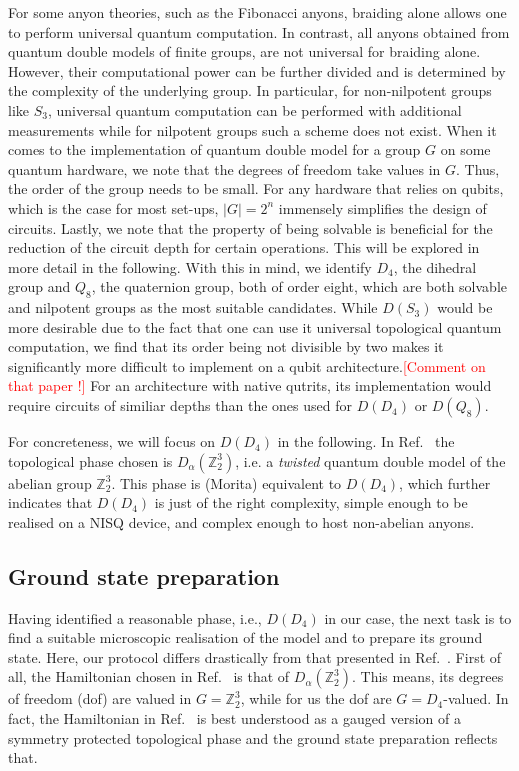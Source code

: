 \documentclass[two column]{article}
\newcommand{\caro}[1]{\textcolor{red}{[#1]}}
\begin{document}
For some anyon theories, such as the Fibonacci anyons, braiding alone allows one to perform universal quantum computation\cite{Freedman2002}. In contrast, all anyons obtained from quantum double models of finite groups, are not universal for braiding alone. However, their computational power can be further divided and is determined by the complexity of the underlying group. In particular, for non-nilpotent groups like $S_3$, universal quantum computation can be performed with additional measurements\cite{Mochon2004} while for nilpotent groups such a scheme does not exist. 
When it comes to the implementation of quantum double model for a group $G$ on some quantum hardware, we note that the degrees of freedom take values in $G$. Thus, the order of the group needs to be small. For any hardware that relies on qubits, which is the case for most set-ups, $|G|=2^n$ immensely simplifies the design of circuits. Lastly, we note that the property of being solvable is beneficial for the reduction of the circuit depth for certain operations. This will be explored in more detail in the following. 
With this in mind, we identify $D_4$, the dihedral group and $Q_8$, the quaternion group, both of order eight, which are both solvable and nilpotent groups as the most suitable candidates.
While $D(S_3)$ would be more desirable due to the fact that one can use it universal topological quantum computation, we find that its order being not divisible by two makes it significantly more difficult to implement on a qubit architecture.\caro{Comment on that paper \cite{goel2023unveiling}!} For an architecture with native qutrits, its implementation would require circuits of similiar depths than the ones used for $D(D_4)$ or $D(Q_8)$.

For concreteness, we will focus on $D(D_4)$ in the following. In Ref.~\cite{iqbal2023creation} the topological phase chosen is $D_\alpha(\mathbb Z_2^3)$, i.e. a \emph{twisted} quantum double model of the abelian group $\mathbb Z_2^3$. This phase is (Morita) equivalent to $D(D_4)$\cite{mapping, propitius1995topological}, which further indicates that $D(D_4)$ is just of the right complexity, simple enough to be realised on a NISQ device, and complex enough to host non-abelian anyons.
\subsection{Ground state preparation}
Having identified a reasonable phase, i.e., $D(D_4)$ in our case, the next task is to find a suitable microscopic realisation of the model and to prepare its ground state. Here, our protocol differs drastically from that presented in Ref.~\cite{iqbal2023creation}. First of all, the Hamiltonian chosen in Ref.~\cite{iqbal2023creation} is that of $D_\alpha(\mathbb Z_2^3)$. This means, its degrees of freedom (dof) are valued in $G=\mathbb Z_2^3$, while for us the dof are $G=D_4$-valued. In fact, the Hamiltonian in Ref.~\cite{iqbal2023creation} is best understood as a gauged version of a symmetry protected topological phase and the ground state preparation reflects that. 
\end{document}

